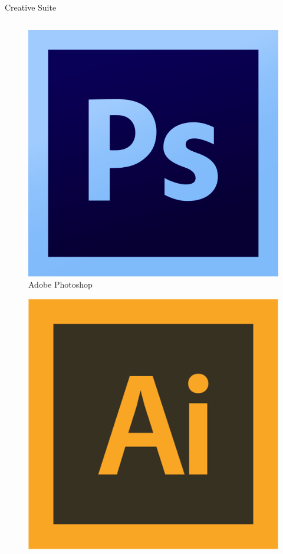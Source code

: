 \documentclass[10pt]{beamer}
\begin{document}
    \begin{frame}{Creative Suite}
        \begin{columns}
            \begin{column}{0.5\textwidth}
                \begin{figure}
                    \includegraphics[height=0.12\paperheight]{images/photoshop}
                    \caption{Adobe Photoshop}
                \end{figure}
                \begin{figure}
                    \includegraphics[height=0.12\paperheight]{images/Illustrator}

\end{figure}
\end{column}
\end{columns}
\end{frame}
\end{document}
